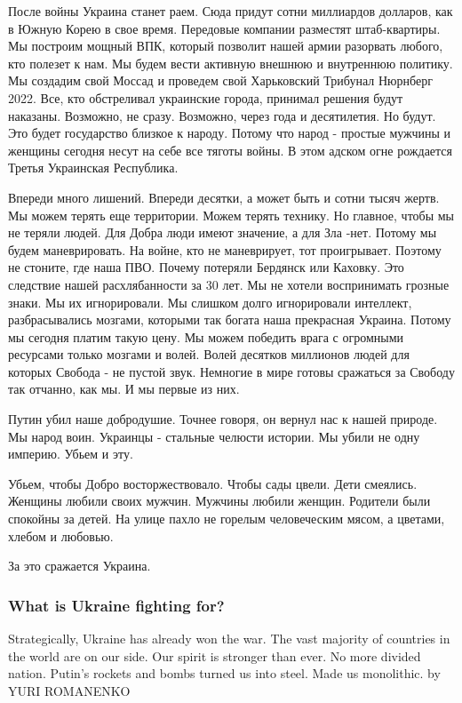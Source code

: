 После войны Украина станет раем. Сюда придут сотни миллиардов долларов, как в
Южную Корею в свое время. Передовые компании разместят штаб-квартиры. Мы
построим мощный ВПК, который позволит нашей армии разорвать любого, кто полезет
к нам. Мы будем вести активную внешнюю и внутреннюю политику. Мы создадим свой
Моссад и проведем свой Харьковский Трибунал Нюрнберг 2022. Все, кто обстреливал
украинские города, принимал решения будут наказаны. Возможно, не сразу.
Возможно, через года и десятилетия. Но будут. Это будет государство близкое к
народу. Потому что народ - простые мужчины и женщины сегодня несут на себе все
тяготы войны. В этом адском огне рождается Третья Украинская Республика.

Впереди много лишений. Впереди десятки, а может быть и сотни тысяч жертв. Мы
можем терять еще территории. Можем терять технику. Но главное, чтобы мы не
теряли людей. Для Добра люди имеют значение, а для Зла -нет. Потому мы будем
маневрировать. На войне, кто не маневрирует, тот проигрывает. Поэтому не
стоните, где наша ПВО. Почему потеряли Бердянск или Каховку. Это следствие
нашей расхлябанности за 30 лет. Мы не хотели воспринимать грозные знаки. Мы их
игнорировали. Мы слишком долго игнорировали интеллект, разбрасывались мозгами,
которыми так богата наша прекрасная Украина. Потому мы сегодня платим такую
цену. Мы можем победить врага с огромными ресурсами только мозгами и волей.
Волей десятков миллионов людей для которых Свобода - не пустой звук. Немногие в
мире готовы сражаться за Свободу так отчанно, как мы. И мы первые из них.

Путин убил наше добродушие. Точнее говоря, он вернул нас к нашей природе. Мы
народ воин. Украинцы - стальные челюсти истории. Мы убили не одну империю.
Убьем и эту.

Убьем, чтобы Добро восторжествовало. Чтобы сады цвели. Дети смеялись. Женщины
любили своих мужчин. Мужчины любили женщин. Родители были спокойны за детей. На
улице пахло не горелым человеческим мясом, а цветами, хлебом и любовью.

За это сражается Украина.

\subsubsection{What is Ukraine fighting for?}

Strategically, Ukraine has already won the war. The vast majority of countries
in the world are on our side. Our spirit is stronger than ever. No more divided
nation. Putin's rockets and bombs turned us into steel. Made us monolithic. by
YURI ROMANENKO

